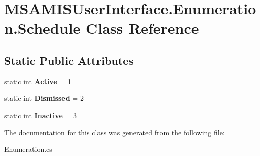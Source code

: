 \hypertarget{class_m_s_a_m_i_s_user_interface_1_1_enumeration_1_1_schedule}{}\section{M\+S\+A\+M\+I\+S\+User\+Interface.\+Enumeration.\+Schedule Class Reference}
\label{class_m_s_a_m_i_s_user_interface_1_1_enumeration_1_1_schedule}
\subsection*{Static Public Attributes}
\begin{DoxyCompactItemize}
\item 
\mbox{\label{class_m_s_a_m_i_s_user_interface_1_1_enumeration_1_1_schedule_a9316307dba07e843412d65e5b977f706}} 
static int {\bfseries Active} = 1
\item 
\mbox{\label{class_m_s_a_m_i_s_user_interface_1_1_enumeration_1_1_schedule_aa85359d6faad7f2bd8664b97e0d98187}} 
static int {\bfseries Dismissed} = 2
\item 
\mbox{\label{class_m_s_a_m_i_s_user_interface_1_1_enumeration_1_1_schedule_aec0f16b60975ceaeedaa26a80034485a}} 
static int {\bfseries Inactive} = 3
\end{DoxyCompactItemize}


The documentation for this class was generated from the following file\+:\begin{DoxyCompactItemize}
\item 
Enumeration.\+cs\end{DoxyCompactItemize}
